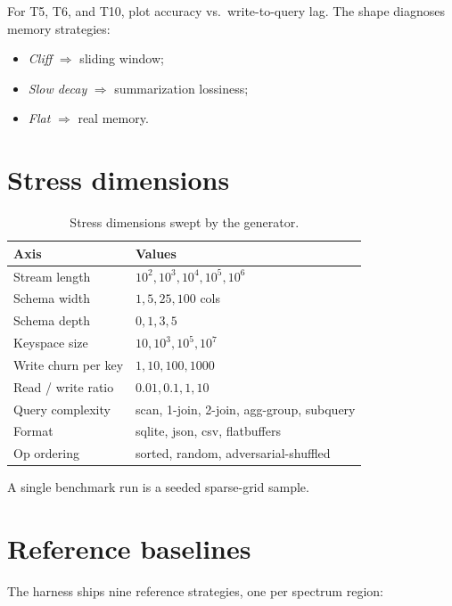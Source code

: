 \documentclass[11pt]{article}
\begin{document}
For T5, T6, and T10, plot accuracy vs.\ write-to-query lag. The shape
diagnoses memory strategies:
\begin{itemize}[leftmargin=*]
  \item \emph{Cliff} $\Rightarrow$ sliding window;
  \item \emph{Slow decay} $\Rightarrow$ summarization lossiness;
  \item \emph{Flat} $\Rightarrow$ real memory.
\end{itemize}

\section{Stress dimensions}
\label{sec:stress}

\begin{table}[h]
\centering
\small
\begin{tabularx}{\linewidth}{@{}l Y@{}}
\toprule
Axis & Values \\
\midrule
Stream length         & $10^2, 10^3, 10^4, 10^5, 10^6$            \\
Schema width          & $1, 5, 25, 100$ cols                      \\
Schema depth          & $0, 1, 3, 5$                              \\
Keyspace size         & $10, 10^3, 10^5, 10^7$                    \\
Write churn per key   & $1, 10, 100, 1000$                        \\
Read / write ratio    & $0.01, 0.1, 1, 10$                        \\
Query complexity      & scan, 1-join, 2-join, agg-group, subquery \\
Format                & sqlite, json, csv, flatbuffers            \\
Op ordering           & sorted, random, adversarial-shuffled      \\
\bottomrule
\end{tabularx}
\caption{Stress dimensions swept by the generator.}
\end{table}

A single benchmark run is a seeded sparse-grid sample.

\section{Reference baselines}
\label{sec:baselines}

The harness ships nine reference strategies, one per spectrum region:
\end{document}
